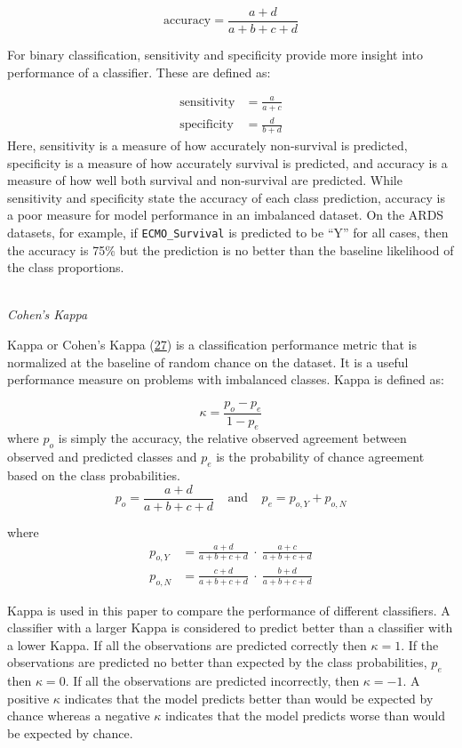 \documentclass[12pt,]{article}
\begin{document}
\[
\text{accuracy} = \frac{a+d}{a+b+c+d} 
\]

For binary classification, sensitivity and specificity provide more
insight into performance of a classifier. These are defined as:

\[
\begin{aligned}
\text{sensitivity} &= \frac{a}{a+c} \\
\text{specificity} &= \frac{d}{b+d}
\end{aligned}
\] Here, sensitivity is a measure of how accurately non-survival is
predicted, specificity is a measure of how accurately survival is
predicted, and accuracy is a measure of how well both survival and
non-survival are predicted. While sensitivity and specificity state the
accuracy of each class prediction, accuracy is a poor measure for model
performance in an imbalanced dataset. On the ARDS datasets, for example,
if \texttt{ECMO\_Survival} is predicted to be ``Y'' for all cases, then
the accuracy is 75\% but the prediction is no better than the baseline
likelihood of the class proportions.

\(~\)\\
\emph{Cohen's Kappa}

Kappa or Cohen's Kappa
(\protect\hyperlink{ref-cohen_coefficient_1960}{27}) is a classification
performance metric that is normalized at the baseline of random chance
on the dataset. It is a useful performance measure on problems with
imbalanced classes. Kappa is defined as:

\[
\kappa = \frac{p_o - p_e}{1 - p_e}
\] where \(p_o\) is simply the accuracy, the relative observed agreement
between observed and predicted classes and \(p_e\) is the probability of
chance agreement based on the class probabilities. \[
p_o = \frac{a+d}{a+b+c+d}  ~~~~~\text{and}~~~~~ p_e = p_{o,Y} + p_{o,N} 
\]

where \[
\begin{aligned}
p_{o,Y} &= \frac{a+d}{a+b+c+d} ~\cdot~ \frac{a+c}{a+b+c+d} \\
p_{o,N} &= \frac{c+d}{a+b+c+d} ~\cdot~ \frac{b+d}{a+b+c+d}
\end{aligned}
\]

Kappa is used in this paper to compare the performance of different
classifiers. A classifier with a larger Kappa is considered to predict
better than a classifier with a lower Kappa. If all the observations are
predicted correctly then \(\kappa=1\). If the observations are predicted
no better than expected by the class probabilities, \(p_e\) then
\(\kappa=0\). If all the observations are predicted incorrectly, then
\(\kappa=-1\). A positive \(\kappa\) indicates that the model predicts
better than would be expected by chance whereas a negative \(\kappa\)
indicates that the model predicts worse than would be expected by
chance.
\end{document}
